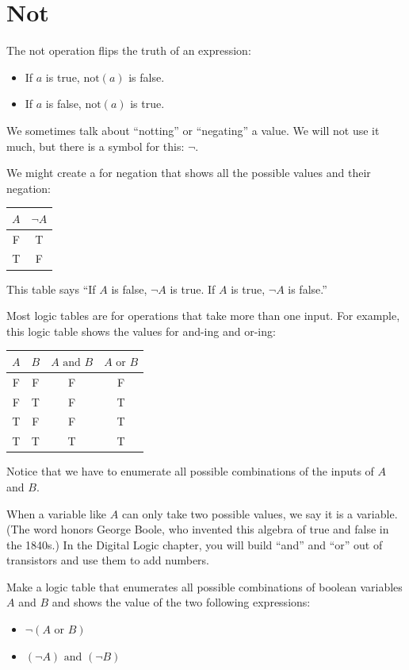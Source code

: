 \section {Not}

The not operation flips the truth of an expression:
\begin{itemize}
\item If $a$ is true, $\text{not}(a)$ is false.

\item If $a$ is false, $\text{not}(a)$ is true.
\end{itemize}

We sometimes talk about ``notting'' or ``negating'' a value.  We will not
use it much, but there is a symbol for this: $\neg$.

We might create a  for negation that shows all
the possible values and their negation:

\begin{tabular}{c | c}
  $A$ & $\neg A$ \\
  \hline
  F & T \\
  T & F
\end{tabular}

This table says ``If $A$ is false, $\neg A$ is true. If $A$ is true,
$\neg A$ is false.''

Most logic tables are for operations that take more than one input.
For example, this logic table shows the values for and-ing and or-ing:

\begin{tabular}{c | c | c | c}
  $A$ & $B$ & $A \text{ and } B$ & $A \text{ or } B$ \\
  \hline
  F & F & F & F \\
  F & T & F & T \\
  T & F & F & T \\
  T & T & T & T \\
\end{tabular}

Notice that we have to enumerate all possible combinations of the
inputs of $A$ and $B$.

When a variable like $A$ can only take two possible values, we say it
is a  variable. (The word honors George Boole, who invented this algebra of true and false in the 1840s.) In the Digital Logic chapter, you will build ``and'' and ``or'' out of transistors and use them to add numbers.

\begin{Exercise}[title={Logic Table}, label=logic_table]

  Make a logic table that enumerates all possible combinations of boolean variables $A$ and $B$ and shows the value of the two following expressions:
  \begin{itemize}
  \item $\neg \left(A \text{ or } B \right)$
  \item $\left(\neg A \right) \text{ and } \left(\neg B \right)$ 
  \end{itemize}

\end{Exercise}

